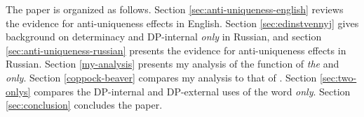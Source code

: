 The paper is organized as follows. Section \ref{sec:anti-uniqueness-english} reviews the evidence for anti-uniqueness effects in English. Section \ref{sec:edinstvennyj} gives background on determinacy and DP-internal \textit{only} in Russian, and section \ref{sec:anti-uniqueness-russian} presents the evidence for anti-uniqueness effects in Russian. Section \ref{my-analysis} presents my analysis of the function of \textit{the} and \textit{only}. Section \ref{coppock-beaver} compares my analysis to that of \citet{cb2015}. Section \ref{sec:two-onlys} compares the DP-internal and DP-external uses of the word \textit{only}. Section \ref{sec:conclusion} concludes the paper.